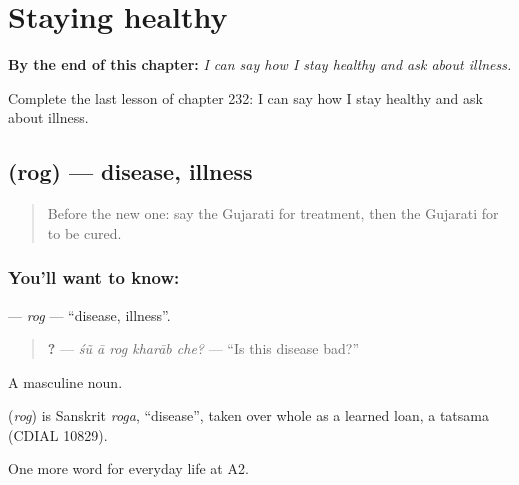 
\chapter{Staying healthy}
\label{ch:gu-staying-healthy}

\begin{chapteropening}
\textbf{By the end of this chapter:} \emph{I can say how I stay healthy and ask about illness.}

Complete the last lesson of chapter 232: I can say how I stay healthy and ask about illness.
\end{chapteropening}

\section[\texorpdfstring{\gu{રોગ} (rog)}{રોગ (rog)}]{ (rog) — disease, illness}

\label{lesson:GU-C232-rog}



\begin{quote}
Before the new one: say the Gujarati for treatment, then the Gujarati for to be cured.
\end{quote}

\subsection*{You'll want to know: }
\textbf{} — \emph{rog} — \textquotedblleft{}disease, illness\textquotedblright{}.

\begin{quote}
\textbf{    ?} — \emph{śũ ā rog kharāb che?} — \textquotedblleft{}Is this disease bad?\textquotedblright{}
\end{quote}

A masculine noun.

\begin{cousinweb}
\textbf{} (\emph{rog}) is Sanskrit \emph{roga}, \textquotedblleft{}disease\textquotedblright{}, taken over whole as a learned loan, a tatsama (CDIAL 10829).
\end{cousinweb}

\begin{grammarlens}[title={What you've built}]
One more word for everyday life at A2.
\end{grammarlens}

